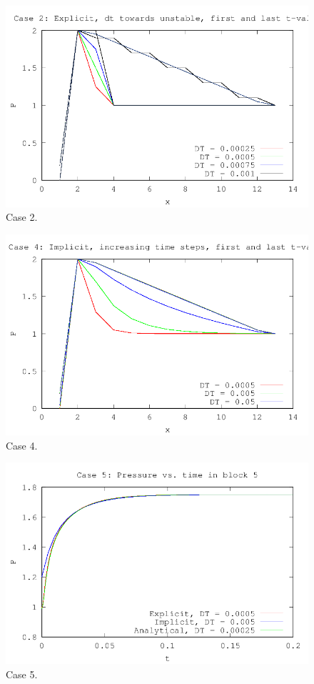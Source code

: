 \begin{figure}[H]
  \centering
  \includegraphics[]{../code/case2.png}
  \caption{Case 2.}
  \label{fig:case2}
\end{figure}

\begin{figure}[H]
  \centering
  \includegraphics[]{../code/case4.png}
  \caption{Case 4.}
  \label{fig:case4}
\end{figure}

\begin{figure}[H]
  \centering
  \includegraphics[]{../code/case5.png}
  \caption{Case 5.}
  \label{fig:case5}
\end{figure}

